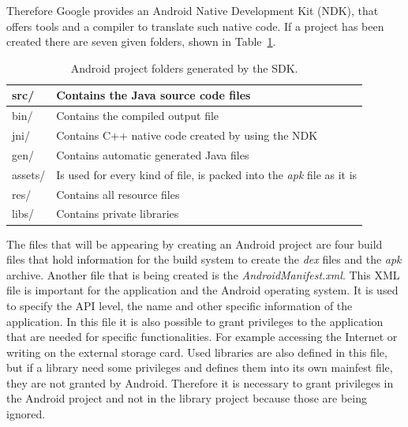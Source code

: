 Therefore Google provides an Android Native Development Kit (NDK), that offers tools and a compiler to translate such native code.
If a project has been created there are seven given folders, shown in Table~\ref{tab:android-project-folders}.
\begin {table}[htpb] 
  \centering
\begin {tabular} {|l|l|}
	\hline
	src/&Contains the Java source code files\\
	\hline
	bin/&Contains the compiled output file\\
	\hline
	jni/&Contains C++ native code created by using the NDK\\
	\hline
	gen/&Contains automatic generated Java files\\
	\hline
	assets/&Is used for every kind of file, is packed into the \textit{apk} file as it is\\
	\hline
	res/&Contains all resource files\\
	\hline
	libs/&Contains private libraries\\
	\hline
\end {tabular}
\caption {Android project folders generated by the SDK.}
\label {tab:android-project-folders}
\end {table}

The files that will be appearing by creating an Android project are four build files that hold information for the build system to create the \textit{dex} files and the \textit{apk} archive.
Another file that is being created is the \textit{AndroidManifest.xml}.
This XML file is important for the application and the Android operating system.
It is used to specify the API level, the name and other specific information of the application.
In this file it is also possible to grant privileges to the application that are needed for specific functionalities.
For example accessing the Internet or writing on the external storage card.
Used libraries are also defined in this file, but if a library need some privileges and defines them into its own mainfest file, they are not granted by Android.
Therefore it is necessary to grant privileges in the Android project and not in the library project because those are being ignored.


